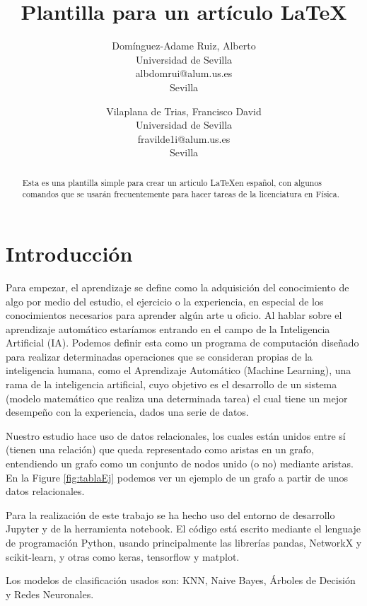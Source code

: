 \documentclass[12pt]{article}
\title{Plantilla para un artículo \LaTeX}
\author{
  Domínguez-Adame Ruiz, Alberto\\
  \small Universidad de Sevilla\\
  \small albdomrui@alum.us.es\\
  \small Sevilla
  \date{}
  \and
 Vilaplana de Trias, Francisco David\\
  \small Universidad de Sevilla\\
  \small fravilde1i@alum.us.es\\
  \small Sevilla
  \date{}
}
\newcommand\tab[1][1cm]{\hspace*{#1}}
\begin{document}


\maketitle




\begin{abstract}
Esta es una plantilla simple para crear un articulo \LaTeX en español, con algunos comandos que se usarán frecuentemente para hacer tareas de la licenciatura en Física.
\end{abstract}


\section{Introducci\'on}


\tab[0,65cm]Para empezar, el aprendizaje se define como la adquisición del conocimiento de algo por medio del estudio, el ejercicio o la experiencia, en especial de los conocimientos necesarios para aprender algún arte u oficio. Al hablar sobre el aprendizaje automático estaríamos entrando en el campo de la Inteligencia Artificial (IA). Podemos definir esta como un programa de computación diseñado para realizar determinadas operaciones que se consideran propias de la inteligencia humana, como el Aprendizaje Automático (Machine Learning), una rama de la inteligencia artificial, cuyo objetivo es el desarrollo de un sistema (modelo matemático que realiza una determinada tarea)  el cual tiene un mejor desempeño con la experiencia, dados una serie de datos.

Nuestro estudio hace uso de datos relacionales, los cuales están unidos entre sí (tienen una relación) que queda representado como aristas en un grafo, entendiendo un grafo como un conjunto de nodos unido (o no) mediante aristas. En la Figure \ref{fig:tablaEj} podemos ver un ejemplo de un grafo a partir de unos datos relacionales. 

Para la realización de este trabajo se ha hecho uso del entorno de desarrollo Jupyter y de la herramienta notebook. El código está escrito mediante el lenguaje de programación Python, usando principalmente las librerías pandas, NetworkX y scikit-learn, y otras como keras, tensorflow y matplot.


Los modelos de clasificación usados son: KNN, Naive Bayes, Árboles de Decisión y Redes Neuronales.
\end{document}
